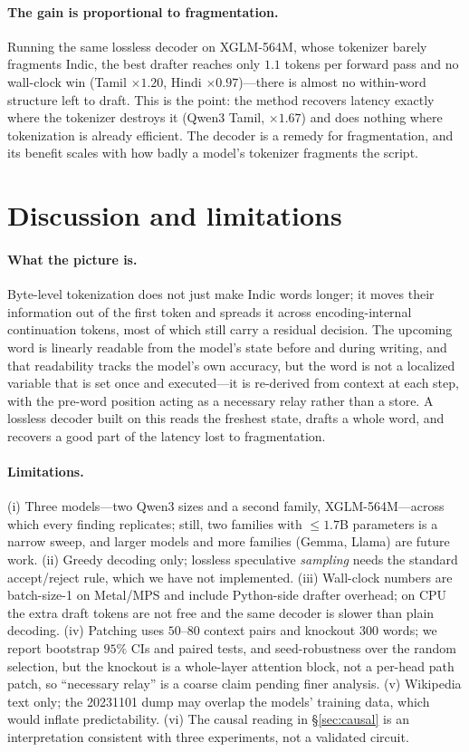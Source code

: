 \documentclass[11pt]{article}
\newcommand{\x}{$\times$}
\begin{document}
\paragraph{The gain is proportional to fragmentation.} Running the same lossless
decoder on XGLM-564M, whose tokenizer barely fragments Indic, the best drafter
reaches only $1.1$ tokens per forward pass and no wall-clock win (Tamil
\x$1.20$, Hindi \x$0.97$)---there is almost no within-word structure left to
draft. This is the point: the method recovers latency exactly where the
tokenizer destroys it (Qwen3 Tamil, \x$1.67$) and does nothing where
tokenization is already efficient. The decoder is a remedy for fragmentation,
and its benefit scales with how badly a model's tokenizer fragments the script.

\section{Discussion and limitations}

\paragraph{What the picture is.} Byte-level tokenization does not just make
Indic words longer; it moves their information out of the first token and
spreads it across encoding-internal continuation tokens, most of which still
carry a residual decision. The upcoming word is linearly readable from the
model's state before and during writing, and that readability tracks the
model's own accuracy, but the word is not a localized variable that is set once
and executed---it is re-derived from context at each step, with the pre-word
position acting as a necessary relay rather than a store. A lossless decoder
built on this reads the freshest state, drafts a whole word, and recovers a
good part of the latency lost to fragmentation.

\paragraph{Limitations.} (i) Three models---two Qwen3 sizes and a second family,
XGLM-564M---across which every finding replicates; still, two families with
$\le 1.7$B parameters is a narrow sweep, and larger models and more families
(Gemma, Llama) are future work. (ii) Greedy decoding only; lossless
speculative \emph{sampling} needs the standard accept/reject rule, which we have
not implemented. (iii) Wall-clock numbers are batch-size-1 on Metal/MPS and
include Python-side drafter overhead; on CPU the extra draft tokens are not free
and the same decoder is slower than plain decoding. (iv) Patching uses
$50$--$80$ context pairs and knockout $300$ words; we report bootstrap $95\%$
CIs and paired tests, and seed-robustness over the random selection, but the
knockout is a whole-layer attention block, not a per-head path patch, so
``necessary relay'' is a coarse claim pending finer analysis. (v) Wikipedia text only; the 20231101 dump may overlap the models'
training data, which would inflate predictability. (vi) The causal reading in
\S\ref{sec:causal} is an interpretation consistent with three experiments, not
a validated circuit.
\end{document}
